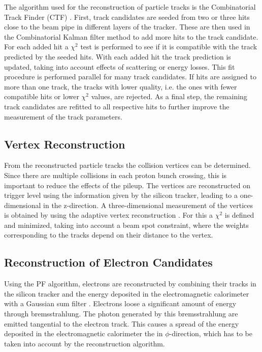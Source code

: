 \noindent The algorithm used for the reconstruction of particle tracks is the Combinatorial Track Finder (CTF) \cite{ctf1,ctf2}. First, track candidates are seeded from two or three hits close to the beam pipe in different layers of the tracker. These are then used in the Combinatorial Kalman filter method \cite{kalman} to add more hits to the track candidate. For each added hit a $\chi^2$ test is performed to see if it is compatible with the track predicted by the seeded hits. With each added hit the track prediction is updated, taking into account effects of scattering or energy losses. This fit procedure is performed parallel for many track candidates. If hits are assigned to more than one track, the tracks with lower quality, i.e. the ones with fewer compatible hits or lower $\chi^2$ values, are rejected. As a final step, the remaining track candidates are refitted to all respective hits to further improve the measurement of the track parameters.

\subsection{Vertex Reconstruction}
From the reconstructed particle tracks the collision vertices can be determined. Since there are multiple collisions in each proton bunch crossing, this is important to reduce the effects of the pileup. The vertices are reconstructed on trigger level using the information given by the silicon tracker, leading to a one-dimensional in the z-direction. A three-dimensional measurement of the vertices is obtained by using the adaptive vertex reconstruction \cite{vertexreco}. For this a $\chi^2$ is defined and minimized, taking into account a beam spot constraint, where the weights corresponding to the tracks depend on their distance to the vertex.
\subsection{Reconstruction of Electron Candidates}
Using the PF algorithm, electrons are reconstructed by combining their tracks in the silicon tracker and the energy deposited in the electromagnetic calorimeter with a Gaussian sum filter \cite{elreco1,elreco2}. Electrons loose a significant amount of energy through bremsstrahlung. The photon generated by this bremsstrahlung are emitted tangential to the electron track. This causes a spread of the energy deposited in the electromagnetic calorimeter the in $\phi$-direction, which has to be taken into account by the reconstruction algorithm.\\

